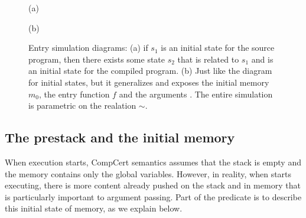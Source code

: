 \begin{figure}\centering
\begin{multicols}{2}

(a)


(b)
\end{multicols}
\caption[Entry simulation diagrams]{Entry simulation diagrams: (a) if $s_1$ is an initial state for the source program, then there exists some state $s_2$ that is related to $s_1$ and is an initial state for the compiled program. (b) Just like the diagram for initial states, but it generalizes and exposes the initial memory $m_0$, the entry function $f$ and the arguments . The entire simulation is parametric on the realation $\sim$.}\label{table:initial_sim}
\end{figure}

\subsection{The prestack and the initial memory}

When execution starts, CompCert semantics assumes that the stack is empty and the memory contains only the global variables. However, in reality, when  starts executing, there is more content already pushed on the stack and in memory that is particularly important to argument passing. Part of the  predicate is to describe this initial state of memory, as we explain below.

